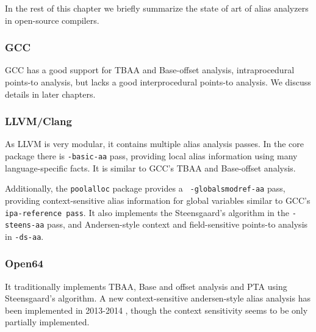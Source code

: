 In the rest of this chapter we briefly summarize the state of art of alias
analyzers in open-source compilers.

\subsubsection{GCC}

GCC has a good support for TBAA and Base-offset analysis, intraprocedural
points-to analysis, but lacks a good interprocedural points-to analysis. We
discuss details in later chapters.

\subsubsection{LLVM/Clang}

As LLVM is very modular, it contains multiple alias analysis passes. In the core
package there is {\tt -basic-aa} pass, providing local alias information using
many language-specific facts. It is similar to GCC's TBAA and Base-offset
analysis.

Additionally, the {\tt poolalloc} package provides a {\tt
-globalsmodref-aa} pass, providing context-sensitive alias information for
global variables similar to GCC's {\tt ipa-reference pass}. It also implements
the Steensgaard's algorithm in the {\tt -steens-aa} pass, and Andersen-style
context and field-sensitive points-to analysis in {\tt -ds-aa}.

\subsubsection{Open64}

It traditionally implements TBAA, Base and offset analysis and PTA using
Steensgaard's algorithm.  A new context-sensitive andersen-style alias analysis has been implemented in
2013-2014 \cite{sui2014}, though the context sensitivity seems to be only
partially implemented.

